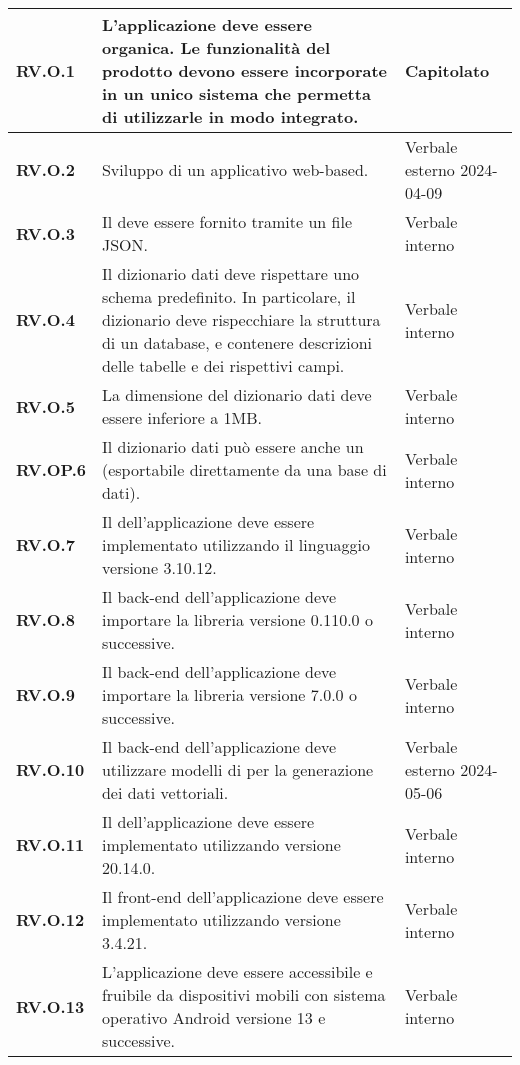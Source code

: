 \begin{adjustwidth}{-0.5cm}{-0.5cm}
\begin{longtable}{|P{3cm}|P{6,5cm}|>{\arraybackslash}P{4cm}|}
    \textbf{RV.O.1} & L'applicazione deve essere organica. Le funzionalità del prodotto devono essere incorporate in un unico sistema che permetta di utilizzarle in modo integrato. & Capitolato \\
    \hline
    \textbf{RV.O.2} & Sviluppo di un applicativo web-based. & Verbale esterno 2024-04-09 \\
    \hline
    \textbf{RV.O.3} & Il  deve essere fornito tramite un file JSON. & Verbale interno \\
    \hline
    \textbf{RV.O.4} & Il dizionario dati deve rispettare uno schema predefinito. In particolare, il dizionario deve rispecchiare la struttura di un database, e contenere descrizioni delle tabelle e dei rispettivi campi. & Verbale interno \\
    \hline
    \textbf{RV.O.5} & La dimensione del dizionario dati deve essere inferiore a 1MB. & Verbale interno \\
    \hline
    \textbf{RV.OP.6} & Il dizionario dati può essere anche un  (esportabile direttamente da una base di dati). & Verbale interno \\
    \hline
    \textbf{RV.O.7} & Il  dell'applicazione deve essere implementato utilizzando il linguaggio  versione 3.10.12. & Verbale interno \\
    \hline
    \textbf{RV.O.8} & Il back-end dell'applicazione deve importare la libreria  versione 0.110.0 o successive. & Verbale interno \\
    \hline
    \textbf{RV.O.9} & Il back-end dell'applicazione deve importare la libreria  versione 7.0.0 o successive. & Verbale interno \\
    \hline
    \textbf{RV.O.10} & Il back-end dell'applicazione deve utilizzare modelli di  per la generazione dei dati vettoriali. & Verbale esterno 2024-05-06 \\
    \hline
    \textbf{RV.O.11} & Il  dell'applicazione deve essere implementato utilizzando  versione 20.14.0. & Verbale interno \\
    \hline
    \textbf{RV.O.12} & Il front-end dell'applicazione deve essere implementato utilizzando  versione 3.4.21. & Verbale interno \\
    \hline
    \textbf{RV.O.13} & L'applicazione deve essere accessibile e fruibile da dispositivi mobili con sistema operativo Android versione 13 e successive. & Verbale interno \\

\end{longtable}
\end{adjustwidth}
